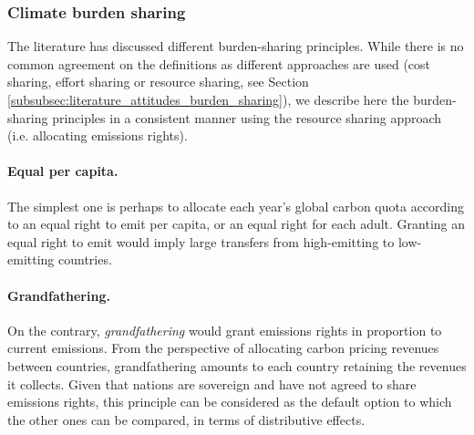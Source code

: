 
\subsubsection{Climate burden sharing}\label{subsubsec:literature_burden_sharing} 

The literature has discussed different burden-sharing principles. While there is no common agreement on the definitions as different approaches are used (cost sharing, effort sharing or resource sharing, see Section \ref{subsubsec:literature_attitudes_burden_sharing}), we describe here the burden-sharing principles in a consistent manner using the resource sharing approach (i.e. allocating emissions rights). 

\paragraph{Equal per capita.} The simplest one is perhaps to allocate each year's global carbon quota according to an equal right to emit per capita, or an equal right for each adult. Granting an equal right to emit would imply large transfers from high-emitting to low-emitting countries. 

\paragraph{Grandfathering.} On the contrary, \textit{grandfathering} would grant emissions rights in proportion to current emissions. From the perspective of allocating carbon pricing revenues between countries, grandfathering amounts to each country retaining the revenues it collects. Given that nations are sovereign and have not agreed to share emissions rights, this principle can be considered as the default option to which the other ones can be compared, in terms of distributive effects.

